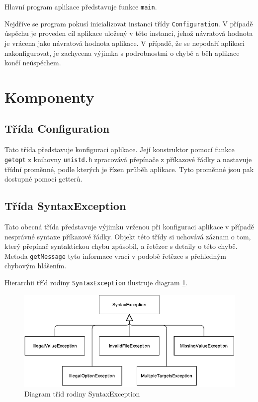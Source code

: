 \documentclass[thesis=B,czech,hidelinks]{thesis}[2012/06/26]
\begin{document}
Hlavní program aplikace představuje funkce \texttt{main}.

Nejdříve se program pokusí inicializovat instanci třídy \texttt{Configuration}. V případě úspěchu je proveden cíl aplikace uložený v této instanci, jehož návratová hodnota je vrácena jako návratová hodnota aplikace. V případě, že se nepodaří aplikaci nakonfigurovat, je zachycena výjimka s podrobnostmi o chybě a běh aplikace končí neúspěchem.

\section{Komponenty}

\subsection{Třída Configuration}

Tato třída představuje konfiguraci aplikace. Její konstruktor pomocí funkce \texttt{getopt} z knihovny \texttt{unistd.h} zpracovává přepínače z příkazové řádky a nastavuje třídní proměnné, podle kterých je řízen průběh aplikace. Tyto proměnné jsou pak dostupné pomocí getterů.

\subsection{Třída SyntaxException}

Tato obecná třída představuje výjimku vrženou při konfiguraci aplikace v případě nesprávné syntaxe příkazové řádky. Objekt této třídy si uchovává záznam o tom, který přepínač syntaktickou chybu způsobil, a řetězec s detaily o této chybě. Metoda \texttt{getMessage} tyto informace vrací v podobě řetězce s přehledným chybovým hlášením.

Hierarchii tříd rodiny \texttt{SyntaxException} ilustruje diagram \ref{fig:syntax_exception}.

\begin{figure}
\centering
\caption{Diagram tříd rodiny SyntaxException}
\label{fig:syntax_exception}
\includegraphics[width=\linewidth]{diagrams/syntax_exception}
\end{figure}
\end{document}
